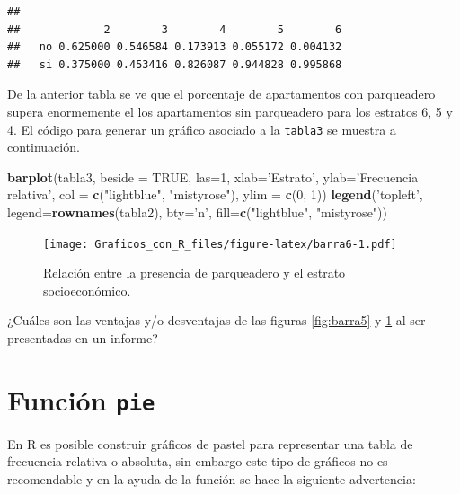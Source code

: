 \documentclass[10pt,]{krantz}
\makeatletter
\newenvironment{Shaded}{\begin{snugshade}}{\end{snugshade}}
\newcommand{\KeywordTok}[1]{\textcolor[rgb]{0.13,0.29,0.53}{\textbf{{#1}}}}
\newcommand{\DataTypeTok}[1]{\textcolor[rgb]{0.13,0.29,0.53}{{#1}}}
\newcommand{\DecValTok}[1]{\textcolor[rgb]{0.00,0.00,0.81}{{#1}}}
\newcommand{\StringTok}[1]{\textcolor[rgb]{0.31,0.60,0.02}{{#1}}}
\newcommand{\OtherTok}[1]{\textcolor[rgb]{0.56,0.35,0.01}{{#1}}}
\newcommand{\NormalTok}[1]{{#1}}
\let\proglang=\textsf
\newenvironment{kframe}{%
\medskip{}
\setlength{\fboxsep}{.8em}
 \def\at@end@of@kframe{}%
 \ifinner\ifhmode%
  \def\at@end@of@kframe{\end{minipage}}%
  \begin{minipage}{\columnwidth}%
 \fi\fi%
 \def\FrameCommand##1{\hskip\@totalleftmargin \hskip-\fboxsep
 \colorbox{shadecolor}{##1}\hskip-\fboxsep
     \hskip-\linewidth \hskip-\@totalleftmargin \hskip\columnwidth}%
 \MakeFramed {\advance\hsize-\width
   \@totalleftmargin\z@ \linewidth\hsize
   \@setminipage}}%
 {\par\unskip\endMakeFramed%
 \at@end@of@kframe}
\renewenvironment{Shaded}{\begin{kframe}}{\end{kframe}}
\makeatother
\begin{document}
\begin{verbatim}
##     
##             2        3        4        5        6
##   no 0.625000 0.546584 0.173913 0.055172 0.004132
##   si 0.375000 0.453416 0.826087 0.944828 0.995868
\end{verbatim}

De la anterior tabla se ve que el porcentaje de apartamentos con
parqueadero supera enormemente el los apartamentos sin parqueadero para
los estratos 6, 5 y 4. El código para generar un gráfico asociado a la
\texttt{tabla3} se muestra a continuación.

\begin{Shaded}
\begin{Highlighting}[]
\KeywordTok{barplot}\NormalTok{(tabla3, }
        \DataTypeTok{beside =} \OtherTok{TRUE}\NormalTok{, }\DataTypeTok{las=}\DecValTok{1}\NormalTok{, }
        \DataTypeTok{xlab=}\StringTok{'Estrato'}\NormalTok{, }\DataTypeTok{ylab=}\StringTok{'Frecuencia relativa'}\NormalTok{,}
        \DataTypeTok{col =} \KeywordTok{c}\NormalTok{(}\StringTok{"lightblue"}\NormalTok{, }\StringTok{"mistyrose"}\NormalTok{),}
        \DataTypeTok{ylim =} \KeywordTok{c}\NormalTok{(}\DecValTok{0}\NormalTok{, }\DecValTok{1}\NormalTok{))}
\KeywordTok{legend}\NormalTok{(}\StringTok{'topleft'}\NormalTok{, }\DataTypeTok{legend=}\KeywordTok{rownames}\NormalTok{(tabla2), }\DataTypeTok{bty=}\StringTok{'n'}\NormalTok{,}
       \DataTypeTok{fill=}\KeywordTok{c}\NormalTok{(}\StringTok{"lightblue"}\NormalTok{, }\StringTok{"mistyrose"}\NormalTok{))}
\end{Highlighting}
\end{Shaded}

\begin{figure}[htbp]
\centering
\texttt{[image: Graficos\_con\_R\_files/figure-latex/barra6-1.pdf]}
\caption{\label{fig:barra6}Relación entre la presencia de parqueadero y el
estrato socioeconómico.}
\end{figure}

¿Cuáles son las ventajas y/o desventajas de las figuras \ref{fig:barra5}
y \ref{fig:barra6} al ser presentadas en un informe?

\section{\texorpdfstring{Función \texttt{pie} 
}{Función pie  }}\label{funcion-pie}

En \proglang{R} es posible construir gráficos de pastel para representar
una tabla de frecuencia relativa o absoluta, sin embargo este tipo de
gráficos no es recomendable y en la ayuda de la función se hace la
siguiente advertencia:
\end{document}
